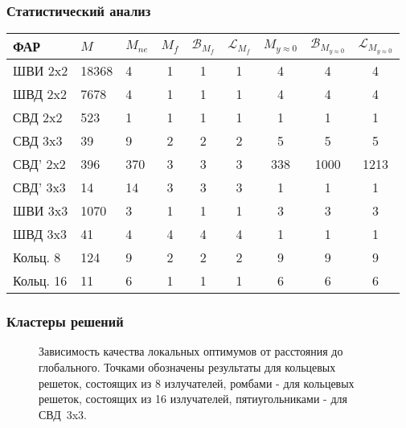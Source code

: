 \begin{frame}
    \frametitle{Статистический анализ}
    \begin{table}[!h]
    \centering
     \begin{tabular}{|l | l l | c c c | c c c|}
    \hline
    \textbf{ФАР} & \textbf{$M$} & \textbf{$M_{ne}$} & \textbf{$M_{f}$} & \textbf{$\mathcal{B}_{M_f}$} & \textbf{$\mathcal{L}_{M_f}$} & \textbf{$M_{y\approx0}$} & \textbf{$\mathcal{B}_{M_{y\approx0}}$} & \textbf{$\mathcal{L}_{M_{y\approx0}}$}\\
    \hline
    ШВИ 2x2 & 18368 & 4 & 1 & 1 & 1 & 4 & 4 & 4\\
    ШВД 2x2 & 7678  & 4 & 1 & 1 & 1 & 4 & 4 & 4\\
    СВД 2x2  & 523  & 1 & 1 & 1 & 1 & 1 & 1 & 1\\
    СВД 3x3  & 39  & 9 & 2 & 2 & 2 & 5 & 5 & 5\\
    СВД' 2x2  & 396  & 370 & 3 & 3 & 3 & 338 & 1000 & 1213\\
    СВД' 3x3  & 14  & 14 & 3 & 3 & 3 & 1 & 1 & 1\\
    ШВИ 3x3 & 1070  & 3 & 1 & 1 & 1 & 3 & 3 & 3 \\
    ШВД 3x3 & 41  & 4 & 4 & 4 & 4 & 1 & 1 & 1 \\
    Кольц. 8 & 124  & 9 & 2 & 2 & 2 & 9 & 9 & 9\\
    Кольц. 16 & 11  & 6 & 1 & 1 & 1& 6 & 6 & 6\\
    \hline
\end{tabular}
    \label{tab:structure2}
\end{table}
\end{frame}


\begin{frame}
    \frametitle{Кластеры решений}

    \begin{figure}
    \centering
        \begin{minipage}[h]{0.8\linewidth}
        \end{minipage}
        \vspace{0.7em}
        \caption{Зависимость качества локальных оптимумов от расстояния до глобального. Точками обозначены результаты для кольцевых решеток, состоящих из 8 излучателей, ромбами - для кольцевых решеток, состоящих из 16 излучателей, пятиугольниками - для СВД~3x3. }
        \label{ris:fit_dist1}
    \end{figure}
\end{frame}

